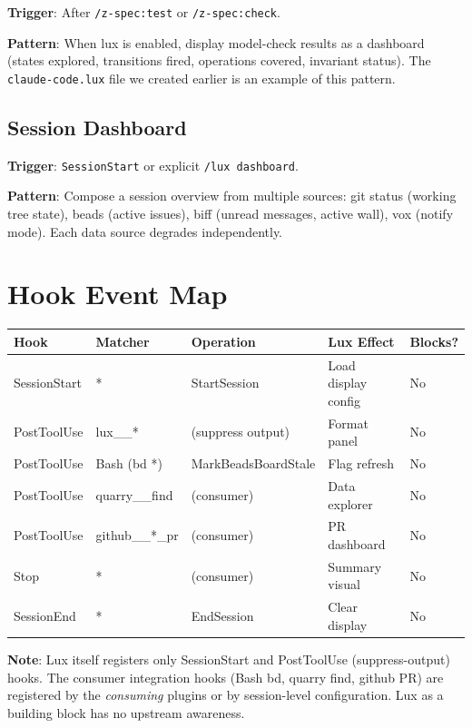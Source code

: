 \documentclass[a4paper,10pt,fleqn]{article}
\begin{document}
\textbf{Trigger}: After \texttt{/z-spec:test} or \texttt{/z-spec:check}.

\textbf{Pattern}: When lux is enabled, display model-check results
as a dashboard (states explored, transitions fired, operations covered,
invariant status). The \texttt{claude-code.lux} file we created earlier
is an example of this pattern.

\subsection{Session Dashboard}

\textbf{Trigger}: \texttt{SessionStart} or explicit \texttt{/lux dashboard}.

\textbf{Pattern}: Compose a session overview from multiple sources:
git status (working tree state), beads (active issues), biff
(unread messages, active wall), vox (notify mode). Each data source
degrades independently.

\section{Hook Event Map}

\begin{tabular}{lllll}
\hline
\textbf{Hook} & \textbf{Matcher} & \textbf{Operation} & \textbf{Lux Effect} & \textbf{Blocks?} \\
\hline
SessionStart & * & StartSession & Load display config & No \\
PostToolUse & lux\_\_* & (suppress output) & Format panel & No \\
PostToolUse & Bash (bd *) & MarkBeadsBoardStale & Flag refresh & No \\
PostToolUse & quarry\_\_find & (consumer) & Data explorer & No \\
PostToolUse & github\_\_*\_pr & (consumer) & PR dashboard & No \\
Stop & * & (consumer) & Summary visual & No \\
SessionEnd & * & EndSession & Clear display & No \\
\hline
\end{tabular}

\textbf{Note}: Lux itself registers only SessionStart and PostToolUse
(suppress-output) hooks. The consumer integration hooks (Bash bd,
quarry find, github PR) are registered by the \emph{consuming} plugins
or by session-level configuration. Lux as a building block has no
upstream awareness.
\end{document}

